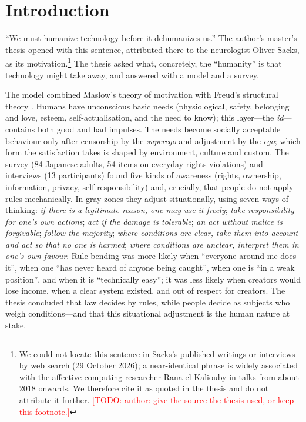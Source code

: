 \documentclass[11pt]{article}
\newcommand{\todo}[1]{\textcolor{red}{[TODO: #1]}}
\begin{document}
\begin{abstract}
\end{abstract}

\section{Introduction}

``We must humanize technology before it dehumanizes us.'' The author's master's thesis \citep{tanohata2017thesis} opened with this sentence, attributed there to the neurologist Oliver Sacks, as its motivation.\footnote{We could not locate this sentence in Sacks's published writings or interviews by web search (29 October 2026); a near-identical phrase is widely associated with the affective-computing researcher Rana el Kaliouby in talks from about 2018 onwards. We therefore cite it as quoted in the thesis and do not attribute it further. \todo{author: give the source the thesis used, or keep this footnote.}} The thesis asked what, concretely, the ``humanity'' is that technology might take away, and answered with a model and a survey.

The model combined Maslow's theory of motivation \citep{maslow1943theory} with Freud's structural theory \citep{freud1923ego}. Humans have unconscious basic needs (physiological, safety, belonging and love, esteem, self-actualisation, and the need to know); this layer---the \emph{id}---contains both good and bad impulses. The needs become socially acceptable behaviour only after censorship by the \emph{superego} and adjustment by the \emph{ego}; which form the satisfaction takes is shaped by environment, culture and custom. The survey (84 Japanese adults, 54 items on everyday rights violations) and interviews (13 participants) found five kinds of awareness (rights, ownership, information, privacy, self-responsibility) and, crucially, that people do not apply rules mechanically. In gray zones they adjust situationally, using seven ways of thinking: \emph{if there is a legitimate reason, one may use it freely}; \emph{take responsibility for one's own actions}; \emph{act if the damage is tolerable}; \emph{an act without malice is forgivable}; \emph{follow the majority}; \emph{where conditions are clear, take them into account and act so that no one is harmed}; \emph{where conditions are unclear, interpret them in one's own favour}. Rule-bending was more likely when ``everyone around me does it'', when one ``has never heard of anyone being caught'', when one is ``in a weak position'', and when it is ``technically easy''; it was less likely when creators would lose income, when a clear system existed, and out of respect for creators. The thesis concluded that law decides by rules, while people decide as subjects who weigh conditions---and that this situational adjustment is the human nature at stake.
\end{document}
